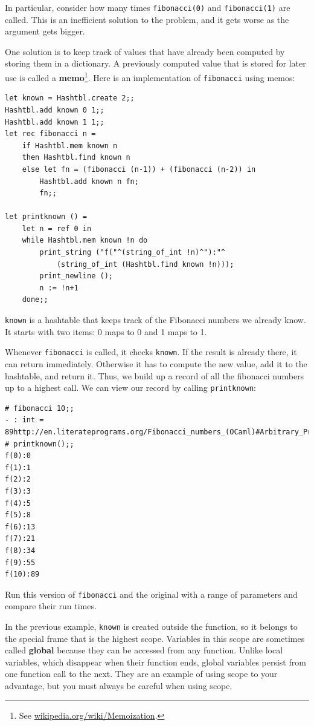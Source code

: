 \documentclass[10pt]{book}
\begin{document}
{

In particular, consider how many times {\tt fibonacci(0)} and {\tt fibonacci(1)} 
are called. This is an inefficient solution to the problem, and it gets
worse as the argument gets bigger.


One solution is to keep track of values that have already been
computed by storing them in a dictionary.  A previously computed value
that is stored for later use is called a {\bf memo}\footnote{See
  \url{wikipedia.org/wiki/Memoization}.}.  Here is an
implementation of {\tt fibonacci} using memos:

\beforeverb
\begin{verbatim}
let known = Hashtbl.create 2;;
Hashtbl.add known 0 1;;
Hashtbl.add known 1 1;;
let rec fibonacci n =
	if Hashtbl.mem known n
	then Hashtbl.find known n
	else let fn = (fibonacci (n-1)) + (fibonacci (n-2)) in
		Hashtbl.add known n fn;
		fn;;

let printknown () = 
	let n = ref 0 in
	while Hashtbl.mem known !n do
		print_string ("f("^(string_of_int !n)^"):"^
			(string_of_int (Hashtbl.find known !n)));
		print_newline ();
		n := !n+1
	done;;
\end{verbatim}
\afterverb
%
{\tt known} is a hashtable that keeps track of the Fibonacci
numbers we already know.  It starts with
two items: 0 maps to 0 and 1 maps to 1.

Whenever {\tt fibonacci} is called, it checks {\tt known}.
If the result is already there, it can return
immediately.  Otherwise it has to 
compute the new value, add it to the hashtable, and return it. 
Thus, we build up a record of all the fibonacci numbers up to 
a highest call. We can view our record by calling {\tt printknown}:

\beforeverb
\begin{verbatim}
# fibonacci 10;;
- : int = 89http://en.literateprograms.org/Fibonacci_numbers_(OCaml)#Arbitrary_Precision
# printknown();;
f(0):0
f(1):1
f(2):2
f(3):3
f(4):5
f(5):8
f(6):13
f(7):21
f(8):34
f(9):55
f(10):89
\end{verbatim}
\afterverb

\begin{ex}
Run this version of {\tt fibonacci} and the original with
a range of parameters and compare their run times.
\end{ex}

In the previous example, {\tt known} is created outside the function,
so it belongs to the special frame that is the highest scope.
Variables in this scope are sometimes called {\bf global}
because they can be accessed from any function.  Unlike local
variables, which disappear when their function ends, global variables
persist from one function call to the next. They are an example of using 
scope to your advantage, but you must always be careful when using scope.

}
\end{document}
